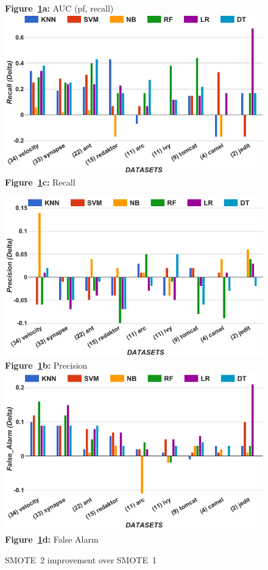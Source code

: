 \begin{figure}[!t]
\begin{minipage}{.5\linewidth}
  {\bf Figure~\ref{fig:tuned}a:} AUC (pf, recall)
        \includegraphics[width=.95\linewidth]{./fig/Recall_tuned.png}
  {\bf Figure~\ref{fig:tuned}c:} Recall
    \end{minipage}%
\begin{minipage}{.5\linewidth}
        \centering
        \includegraphics[width=.95\linewidth]{./fig/prec_tuned.png}
  {\bf Figure~\ref{fig:tuned}b:} Precision
        \includegraphics[width=.95\linewidth]{./fig/pf_tuned.png}
  {\bf Figure~\ref{fig:tuned}d:} False Alarm
    \end{minipage}%
    \caption{SMOTE~2 improvement over SMOTE~1}
    \label{fig:tuned}
\end{figure}

